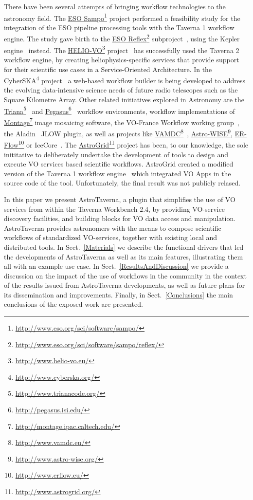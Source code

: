 \documentclass[final,authoryear,5p,times,twocolumn]{elsarticle}
\newcommand{\urlsamefont}[1]{\urlstyle{same}\url{#1}}
\newcommand{\hrefnote}[2]{\href{#1}{#2}\footnote{\urlsamefont{#1}}}
\begin{document}
There have been several attempts of bringing workflow technologies to the astronomy field. The \hrefnote{http://www.eso.org/sci/software/sampo/}{ESO Sampo} project performed a feasibility study for the integration of the ESO pipeline processing tools with the Taverna 1 workflow engine. The study gave birth to the \hrefnote{http://www.eso.org/sci/software/sampo/reflex/}{ESO Reflex} subproject~\citep{Hook2009}, using the Kepler engine~\citep{Altintas2004} instead. The \hrefnote{http://www.helio-vo.eu/}{HELIO-VO} project~\citep{Bentley2013} has successfully used the Taverna 2 workflow engine, by creating heliophysics-specific services that provide support for their scientific use cases in a Service-Oriented Architecture. In the \hrefnote{http://www.cyberska.org/}{CyberSKA} project~\citep{Kiddle2011} a web-based workflow builder is being developed to address the evolving data-intensive science needs of future radio telescopes such as the Square Kilometre Array. Other related initiatives explored in Astronomy are the \hrefnote{http://www.trianacode.org/}{Triana}~\citep{Taylor2007} and \hrefnote{http://pegasus.isi.edu/}{Pegasus}~\citep{Deelman:2005:PFM:1239649.1239653} workflow environments, workflow implementations of \hrefnote{http://montage.ipac.caltech.edu/}{Montage} image mosaicing software, the VO-France Workflow working group~\citep{Schaaff2008}, the Aladin~\citep{Bonnarel2000} JLOW plugin, as well as projects like \hrefnote{http://www.vamdc.eu/}{VAMDC}~\citep{Walton2011}, \hrefnote{http://www.astro-wise.org/}{Astro-WISE}, \hrefnote{http://www.erflow.eu/}{ER-Flow} or IceCore~\citep{Maisala2012}. The \hrefnote{http://www.astrogrid.org/}{AstroGrid} project has been, to our knowledge, the sole inititative to deliberately undertake the development of tools to design and execute VO services based scientific workflows. AstroGrid created a modified version of the Taverna 1 workflow engine~\citep{Benson2009, Walton2010} which integrated VO Apps in the source code of the tool. Unfortunately, the final result was not publicly relased.

In this paper we present AstroTaverna, a plugin that simplifies the use of VO services from within the Taverna Workbench 2.4, by providing VO-service discovery facilities, and building blocks for VO data access and manipulation. AstroTaverna provides astronomers with the means to compose scientific workflows of standardized VO-services, together with existing local and distributed tools. In Sect.~\ref{Materials} we describe the functional drivers that led the developments of AstroTaverna as well as its main features, illustrating them all with an example use case. In Sect.~\ref{ResultsAndDiscussion} we provide a discussion on the impact of the use of workflows in the community in the context of the results issued from AstroTaverna developments, as well as future plans for its dissemination and improvements. Finally, in Sect.~\ref{Conclusions} the main conclusions of the exposed work are presented. 
\end{document}
